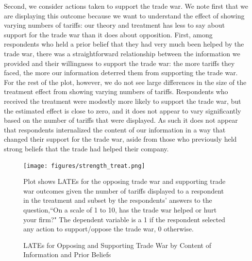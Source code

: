 \documentclass{article}
\begin{document}
Second, we consider actions taken to support the trade war. We note first that we are displaying this outcome because we want to understand the effect of showing varying numbers of tariffs: our theory and treatment has less to say about support for the trade war than it does about opposition. First, among respondents who held a prior belief that they had very much been helped by the trade war, there was a straightforward relationship between the information we provided and their willingness to support the trade war: the more tariffs they faced, the more our information deterred them from supporting the trade war. For the rest of the plot, however, we do not see large differences in the size of the treatment effect from showing varying numbers of tariffs. Respondents who received the treatment were modestly more likely to support the trade war, but the estimated effect is close to zero, and it does not appear to vary significantly based on the number of tariffs that were displayed. As such it does not appear that respondents internalized the content of our information in a way that changed their support for the trade war, aside from those who previously held strong beliefs that the trade had helped their company.

\begin{figure}
    \centering
    \texttt{[image: figures/strength\_treat.png]}
    
    \raggedright \scriptsize Plot shows LATEs for the opposing trade war and supporting trade war outcomes given the number of tariffs displayed to a respondent in the treatment and subset by the respondents' answers to the question,``On a scale of 1 to 10, has the trade war helped or hurt your firm?" The dependent variable is a 1 if the respondent selected any action to support/oppose the trade war, 0 otherwise. 
    \caption{LATEs for Opposing and Supporting Trade War by Content of Information and Prior Beliefs}
    \label{treatstrength}
\end{figure}

\end{document}
